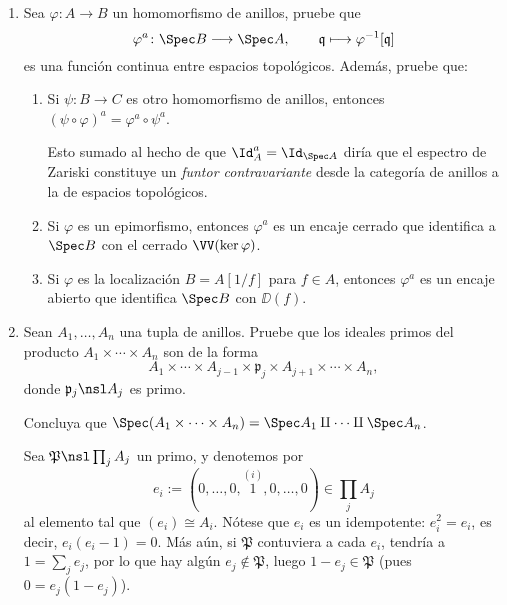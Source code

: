 \documentclass[11pt, reqno]{amsart}
\begin{document}
\begin{enumerate}
\begin{enumerate}[resume]
		\end{enumerate}
	\item Sea $\varphi \colon A \to B$ un homomorfismo de anillos, pruebe que
		\[
			\varphi^a \colon \Spec B \longrightarrow \Spec A, \qquad
			\mathfrak{q} \longmapsto \varphi^{-1}[\mathfrak{q}]
		\]
		es una función continua entre espacios topológicos.
		Además, pruebe que:
		\begin{enumerate}
			\item Si $\psi \colon B \to C$ es otro homomorfismo de anillos, entonces $(\psi\circ \varphi)^a
				= \varphi^a\circ \psi^a$.
				
				\lookup
				Esto sumado al hecho de que $\Id_A^a = \Id_{\Spec A}$ diría que el espectro de Zariski
				constituye un \emph{funtor contravariante} desde la categoría de anillos a la de
				espacios topológicos.
			\item\label{prob:quot_closed_emb}
				Si $\varphi$ es un epimorfismo, entonces $\varphi^a$ es un encaje cerrado que identifica a
				$\Spec B$ con el cerrado $\VV(\ker\varphi)$.
			\item Si $\varphi$ es la localización $B = A[1/f]$ para $f \in A$, entonces $\varphi^a$ es un
				encaje abierto que identifica $\Spec B$ con $\DD(f)$.
		\end{enumerate}

	\item Sean $A_1, \dots, A_n$ una tupla de anillos.
		Pruebe que los ideales primos del producto $A_1 \times \cdots \times A_n$ son de la forma
		\[
			A_1 \times \cdots \times A_{j-1} \times \mathfrak{p}_j \times A_{j+1} \times \cdots \times A_n,
		\]
		donde $\mathfrak{p}_j \nsl A_j$ es primo.

		Concluya que $\Spec(A_1 \times \cdots \times A_n) = \Spec A_1 \amalg \cdots \amalg \Spec A_n$.

		\begin{sol}
			Sea $\mathfrak{P} \nsl \prod_{j} A_j$ un primo, y denotemos por
			\[
				e_i := (0, \dots, 0, \overset{(i)}{1}, 0, \dots, 0) \in \prod_{j} A_j
			\]
			al elemento tal que $(e_i) \cong A_i$.
			Nótese que $e_i$ es un idempotente: $e_i^2 = e_i$, es decir, $e_i(e_i - 1) = 0$.
			Más aún, si $\mathfrak{P}$ contuviera a cada $e_i$, tendría a $1 = \sum_{j} e_j$, por lo que hay
			algún $e_j \notin \mathfrak{P}$, luego $1 - e_j \in \mathfrak{P}$ (pues $0 = e_j(1 - e_j)$).


\end{sol}
\end{enumerate}
\end{document}
